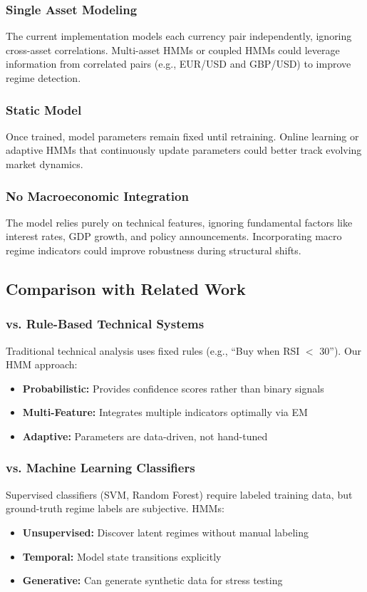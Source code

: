 \documentclass[conference]{IEEEtran}
\begin{document}
\subsubsection{Single Asset Modeling}
The current implementation models each currency pair independently, ignoring cross-asset correlations. Multi-asset HMMs or coupled HMMs could leverage information from correlated pairs (e.g., EUR/USD and GBP/USD) to improve regime detection.

\subsubsection{Static Model}
Once trained, model parameters remain fixed until retraining. Online learning or adaptive HMMs that continuously update parameters could better track evolving market dynamics.

\subsubsection{No Macroeconomic Integration}
The model relies purely on technical features, ignoring fundamental factors like interest rates, GDP growth, and policy announcements. Incorporating macro regime indicators could improve robustness during structural shifts.

\subsection{Comparison with Related Work}

\subsubsection{vs. Rule-Based Technical Systems}
Traditional technical analysis uses fixed rules (e.g., ``Buy when RSI $<$ 30''). Our HMM approach:
\begin{itemize}
\item \textbf{Probabilistic:} Provides confidence scores rather than binary signals
\item \textbf{Multi-Feature:} Integrates multiple indicators optimally via EM
\item \textbf{Adaptive:} Parameters are data-driven, not hand-tuned
\end{itemize}

\subsubsection{vs. Machine Learning Classifiers}
Supervised classifiers (SVM, Random Forest) require labeled training data, but ground-truth regime labels are subjective. HMMs:
\begin{itemize}
\item \textbf{Unsupervised:} Discover latent regimes without manual labeling
\item \textbf{Temporal:} Model state transitions explicitly
\item \textbf{Generative:} Can generate synthetic data for stress testing
\end{itemize}
\end{document}
